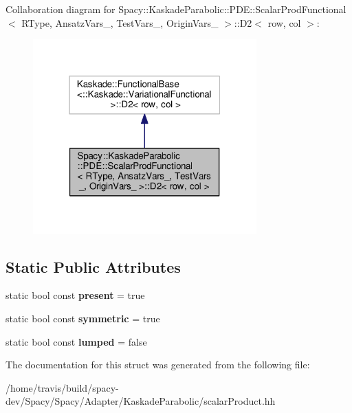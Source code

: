 Collaboration diagram for Spacy\-:\-:Kaskade\-Parabolic\-:\-:P\-D\-E\-:\-:Scalar\-Prod\-Functional$<$ R\-Type, Ansatz\-Vars\-\_\-, Test\-Vars\-\_\-, Origin\-Vars\-\_\- $>$\-:\-:D2$<$ row, col $>$\-:
\nopagebreak
\begin{figure}[H]
\begin{center}
\leavevmode
\includegraphics[width=244pt]{structSpacy_1_1KaskadeParabolic_1_1PDE_1_1ScalarProdFunctional_1_1D2__coll__graph}
\end{center}
\end{figure}
\subsection*{Static Public Attributes}
\begin{DoxyCompactItemize}
\item 
\hypertarget{structSpacy_1_1KaskadeParabolic_1_1PDE_1_1ScalarProdFunctional_1_1D2_a21db9a31b4e04267bcc36e6bf86ad379}{static bool const {\bfseries present} = true}\label{structSpacy_1_1KaskadeParabolic_1_1PDE_1_1ScalarProdFunctional_1_1D2_a21db9a31b4e04267bcc36e6bf86ad379}

\item 
\hypertarget{structSpacy_1_1KaskadeParabolic_1_1PDE_1_1ScalarProdFunctional_1_1D2_a4e4dad5178acb09e37813971b9033662}{static bool const {\bfseries symmetric} = true}\label{structSpacy_1_1KaskadeParabolic_1_1PDE_1_1ScalarProdFunctional_1_1D2_a4e4dad5178acb09e37813971b9033662}

\item 
\hypertarget{structSpacy_1_1KaskadeParabolic_1_1PDE_1_1ScalarProdFunctional_1_1D2_a1afb30a8428a5775cc999be476fd96b5}{static bool const {\bfseries lumped} = false}\label{structSpacy_1_1KaskadeParabolic_1_1PDE_1_1ScalarProdFunctional_1_1D2_a1afb30a8428a5775cc999be476fd96b5}

\end{DoxyCompactItemize}


The documentation for this struct was generated from the following file\-:\begin{DoxyCompactItemize}
\item 
/home/travis/build/spacy-\/dev/\-Spacy/\-Spacy/\-Adapter/\-Kaskade\-Parabolic/scalar\-Product.\-hh\end{DoxyCompactItemize}
